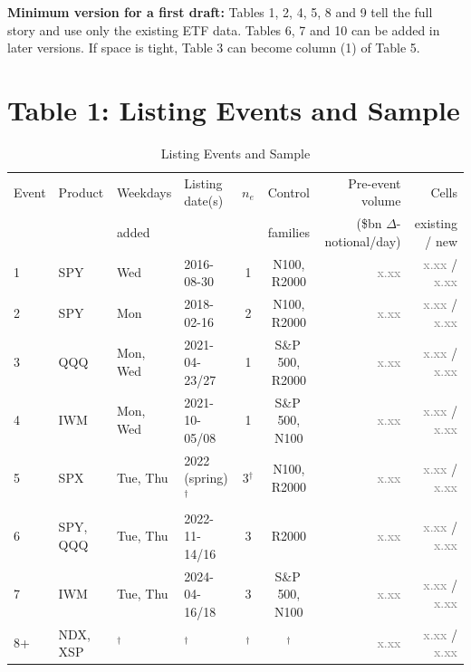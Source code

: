 \documentclass[11pt]{article}
\newcommand{\ph}{\textcolor{gray}{x.xx}}
\begin{document}
\noindent\textbf{Minimum version for a first draft:} Tables 1, 2, 4, 5, 8 and 9 tell the full story and use only the existing ETF data. Tables 6, 7 and 10 can be added in later versions. If space is tight, Table 3 can become column (1) of Table 5.

\clearpage
\section*{Table 1: Listing Events and Sample}

\begin{table}[H]
\centering\footnotesize
\setlength{\tabcolsep}{3.5pt}
\begin{threeparttable}
\caption{Listing Events and Sample}
\begin{tabular}{llllccrr}
\toprule
Event & Product & Weekdays & Listing date(s) & $n_e$ & Control  & Pre-event volume            & Cells \\
      &         & added    &                 &       & families & (\$bn $\Delta$-notional/day) & existing / new \\
\midrule
1  & SPY      & Wed      & 2016-08-30               & 1           & N100, R2000      & \ph & \ph{} / \ph \\
2  & SPY      & Mon      & 2018-02-16               & 2           & N100, R2000      & \ph & \ph{} / \ph \\
3  & QQQ      & Mon, Wed & 2021-04-23/27            & 1           & S\&P\,500, R2000  & \ph & \ph{} / \ph \\
4  & IWM      & Mon, Wed & 2021-10-05/08            & 1           & S\&P\,500, N100   & \ph & \ph{} / \ph \\
5  & SPX      & Tue, Thu & 2022 (spring)$^\dagger$  & 3$^\dagger$ & N100, R2000      & \ph & \ph{} / \ph \\
6  & SPY, QQQ & Tue, Thu & 2022-11-14/16            & 3           & R2000            & \ph & \ph{} / \ph \\
7  & IWM      & Tue, Thu & 2024-04-16/18            & 3           & S\&P\,500, N100   & \ph & \ph{} / \ph \\
8+ & NDX, XSP & $^\dagger$ & $^\dagger$             & $^\dagger$  & $^\dagger$       & \ph & \ph{} / \ph \\
\bottomrule
\end{tabular}
\begin{tablenotes}
\footnotesize

\end{tablenotes}
\end{threeparttable}
\end{table}
\end{document}
